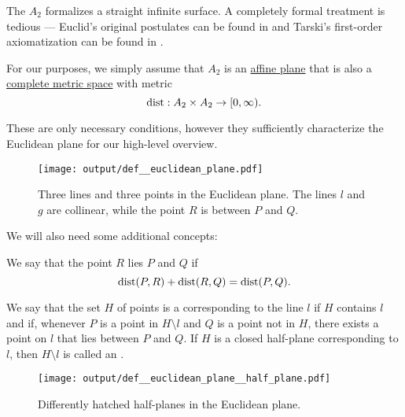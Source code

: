 \begin{definition}\label{def:euclidean_plane}\mimprovised
  The  \( A_2 \) formalizes a straight infinite surface. A completely formal treatment is tedious --- Euclid's original postulates can be found in \cite[7]{Fitzpatrick2008} and Tarski's first-order axiomatization can be found in \cite{Tarski1959}.

  For our purposes, we simply assume that \( A_2 \) is an \hyperref[def:affine_plane]{affine plane} that is also a \hyperref[def:complete_metric_space]{complete metric space} with metric
  \begin{equation*}
    \operatorname{dist}: A_2 \times A_2 \to [0, \infty).
  \end{equation*}

  These are only necessary conditions, however they sufficiently characterize the Euclidean plane for our high-level overview.

  \begin{figure}[!ht]
    \centering
    \texttt{[image: output/def\_\_euclidean\_plane.pdf]}
    \caption{Three lines and three points in the Euclidean plane. The lines \( l \) and \( g \) are collinear, while the point \( R \) is between \( P \) and \( Q \).}\label{fig:def:euclidean_plane}
  \end{figure}

  We will also need some additional concepts:
  \begin{thmenum}
     We say that the point \( R \) lies  \( P \) and \( Q \) if
    \begin{equation*}
      \operatorname{dist}(P, R) + \operatorname{dist}(R, Q) = \operatorname{dist}(P, Q).
    \end{equation*}

     We say that the set \( H \) of points is a  corresponding to the line \( l \) if \( H \) contains \( l \) and if, whenever \( P \) is a point in \( H \setminus l \) and \( Q \) is a point not in \( H \), there exists a point on \( l \) that lies between \( P \) and \( Q \). If \( H \) is a closed half-plane corresponding to \( l \), then \( H \setminus l \) is called an .

    \begin{figure}[!ht]
      \centering
      \texttt{[image: output/def\_\_euclidean\_plane\_\_half\_plane.pdf]}
      \caption{Differently hatched half-planes in the Euclidean plane.}\label{fig:def:euclidean_plane/half_plane}
    \end{figure}


\end{thmenum}
\end{definition}
